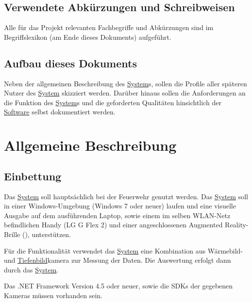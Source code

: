 \subsection{Verwendete Abkürzungen und Schreibweisen}
Alle für das Projekt relevanten Fachbegriffe und Abkürzungen sind im Begriffslexikon 
(am Ende dieses Dokuments) aufgeführt.

\subsection{Aufbau dieses Dokuments}
Neben der allgemeinen Beschreibung des \hyperlink{tab:system}{System}s, sollen die Profile aller späteren Nutzer des \hyperlink{tab:system}{System} skizziert werden.
Darüber hinaus sollen die Anforderungen an die Funktion des \hyperlink{tab:system}{System}s und die geforderten Qualitäten hinsichtlich der \hyperlink{tab:anwendung}{Software} selbst dokumentiert werden.

\section{Allgemeine Beschreibung}
\label{chap:spezi_desc}

\subsection{Einbettung}
Das \hyperlink{tab:system}{System} \profire soll hauptsächlich bei der Feuerwehr genutzt werden.
Das \hyperlink{tab:system}{System} soll in einer Windows-Umgebung (Windows 7 oder neuer) laufen und eine visuelle Ausgabe auf dem ausführenden Laptop, sowie einem im selben WLAN-Netz befindlichen Handy (LG G Flex 2) und einer angeschlossenen Augmented Reality-Brille (\meta), unterstützen.

Für die Funktionalität verwendet das \hyperlink{tab:system}{System} eine Kombination aus Wärmebild- und \hyperlink{tab:tiefe}{Tiefenbild}kamera zur Messung der Daten. Die Auswertung erfolgt dann durch das \hyperlink{tab:system}{System}.

Das .NET Framework Version 4.5 oder neuer, sowie die SDKs der gegebenen Kameras müssen vorhanden sein.

